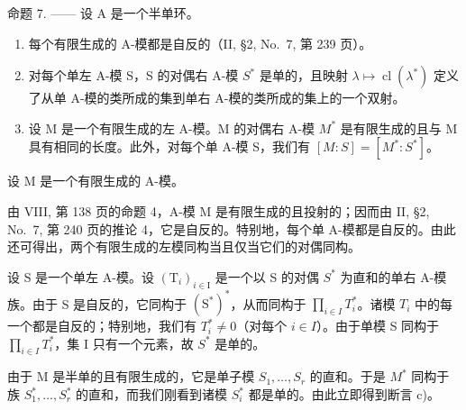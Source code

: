 命题 7. —— 设 A 是一个半单环。

\begin{enumerate}
\def\labelenumi{\alph{enumi})}
\item
  每个有限生成的 A-模都是自反的（II, §2, No.~7, 第 239 页）。
\item
  对每个单左 A-模 S，S 的对偶右 A-模 \(S^{*}\) 是单的，且映射 \(\lambda \mapsto \operatorname{cl}(\lambda^{*})\) 定义了从单 A-模的类所成的集到单右 A-模的类所成的集上的一个双射。
\item
  设 M 是一个有限生成的左 A-模。M 的对偶右 A-模 \(M^{*}\) 是有限生成的且与 M 具有相同的长度。此外，对每个单 A-模 S，我们有 \([M:S]=[M^{*}:S^{*}]\)。
\end{enumerate}

设 \(\mathrm{M}\) 是一个有限生成的 A-模。

由 VIII, 第 138 页的命题 4，A-模 M 是有限生成的且投射的；因而由 II, §2, No.~7, 第 240 页的推论 4，它是自反的。特别地，每个单 A-模都是自反的。由此还可得出，两个有限生成的左模同构当且仅当它们的对偶同构。

设 S 是一个单左 A-模。设 \((\mathrm{T}_{i})_{i\in\mathrm{I}}\) 是一个以 S 的对偶 \(S^{*}\) 为直和的单右 A-模族。由于 S 是自反的，它同构于 \((\mathrm{S}^{*})^{*}\)，从而同构于 \(\prod_{i\in I}T_{i}^{*}\)。诸模 \(T_{i}\) 中的每一个都是自反的；特别地，我们有 \(T_{i}^{*}\neq0\)（对每个 \(i\in I\)）。由于单模 S 同构于 \(\prod_{i\in I}T_{i}^{*}\)，集 I 只有一个元素，故 \(S^{*}\) 是单的。

由于 M 是半单的且有限生成的，它是单子模 \(S_{1},\ldots,S_{r}\) 的直和。于是 \(M^{*}\) 同构于族 \(S_{1}^{*},\ldots,S_{r}^{*}\) 的直和，而我们刚看到诸模 \(S_{i}^{*}\) 都是单的。由此立即得到断言 c)。

